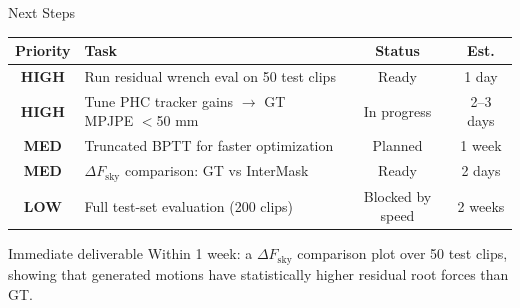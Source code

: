 \documentclass[aspectratio=169, 10pt]{beamer}
\newcommand{\highlight}[1]{\textcolor{physblue}{\textbf{#1}}}
\begin{document}
\begin{frame}{Next Steps}
  \begin{center}
  \begin{tabular}{clcc}
    \toprule
    \textbf{Priority} & \textbf{Task} & \textbf{Status} & \textbf{Est.} \\
    \midrule
    \highlight{HIGH} & Run residual wrench eval on 50 test clips & Ready & 1 day \\
    \highlight{HIGH} & Tune PHC tracker gains $\to$ GT MPJPE $<$50 mm & In progress & 2--3 days \\
    \highlight{MED} & Truncated BPTT for faster optimization & Planned & 1 week \\
    \highlight{MED} & $\Delta F_\text{sky}$ comparison: GT vs InterMask & Ready & 2 days \\
    \highlight{LOW} & Full test-set evaluation (200 clips) & Blocked by speed & 2 weeks \\
    \bottomrule
  \end{tabular}
  \end{center}

  \vspace{0.8em}
  \begin{block}{Immediate deliverable}
    Within 1 week: a $\Delta F_\text{sky}$ comparison plot over 50 test clips,
    showing that generated motions have statistically higher residual root forces than GT.
  \end{block}
\end{frame}

\end{document}
